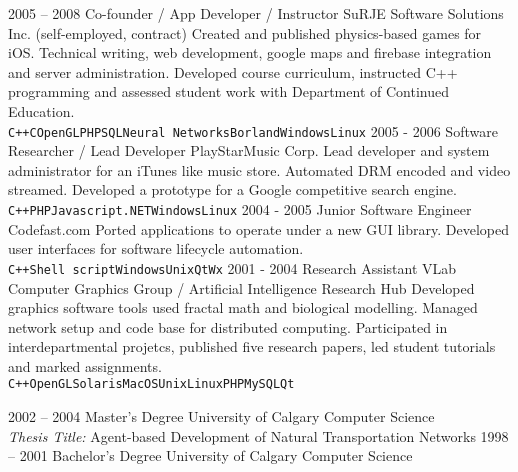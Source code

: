 \documentclass[9pt]{developercv} %
\begin{document}
\begin{entrylist}
	\entry
		{2005 -- 2008}
		{Co-founder / App Developer / Instructor}
		{SuRJE Software Solutions Inc. (self-employed, contract)}
		{Created and published physics-based games for iOS. Technical writing, web development, google maps and firebase integration and server administration. Developed course curriculum, instructed C++ programming and assessed student work with Department of Continued Education.\\ \texttt{C++}\slashsep\texttt{C}\slashsep\texttt{OpenGL}\slashsep\texttt{PHP}\slashsep\texttt{SQL}\slashsep\texttt{Neural Networks}\slashsep\texttt{Borland}\slashsep\texttt{Windows}\slashsep\texttt{Linux}}
	\entry
		{2005 - 2006}
		{Software Researcher / Lead Developer}
		{PlayStarMusic Corp.}
		{Lead developer and system administrator for an iTunes like music store. Automated DRM encoded and video streamed. Developed a prototype for a Google competitive search engine.
\\ \texttt{C++}\slashsep\texttt{PHP}\slashsep\texttt{Javascript}\slashsep\texttt{.NET}\slashsep\texttt{Windows}\slashsep\texttt{Linux}}
	\entry
		{2004 - 2005}
		{Junior Software Engineer}
		{Codefast.com }
		{Ported applications to operate under a new GUI library. Developed user interfaces for software lifecycle automation.\\ \texttt{C++}\slashsep\texttt{Shell script}\slashsep\texttt{Windows}\slashsep\texttt{Unix}\slashsep\texttt{Qt}\slashsep\texttt{Wx}}
	\entry
		{2001 - 2004}
		{Research Assistant}
		{VLab Computer Graphics Group / Artificial Intelligence Research Hub}
		{Developed graphics software tools used fractal math and biological modelling. Managed network setup and code base for distributed computing. Participated in interdepartmental projetcs, published five research papers, led student tutorials and marked assignments.\\ \texttt{C++}\slashsep\texttt{OpenGL}\slashsep\texttt{Solaris}\slashsep\texttt{MacOS}\slashsep\texttt{Unix}\slashsep\texttt{Linux}\slashsep\texttt{PHP}\slashsep\texttt{MySQL}\slashsep\texttt{Qt}}
\end{entrylist}



\begin{entrylist}
	\entry
		{2002 -- 2004}
		{Master's Degree}
		{University of Calgary}
		{Computer Science\\\footnotesize{{\sl Thesis Title:} Agent-based Development of Natural Transportation Networks}}
	\entry
		{1998 -- 2001}
		{Bachelor's Degree}
		{University of Calgary}
		{Computer Science}
\end{entrylist}
\end{document}
